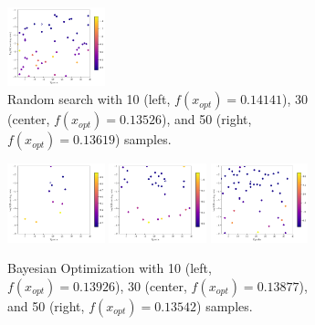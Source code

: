 \begin{figure}[H]
\begin{subfigure}{\textwidth}
		\includegraphics[width=0.31\textwidth]{figures/Results/First_comparison/Random50}
		\caption{ Random search with 10 (left, $f(x_{opt}) = 0.14141$), 30 (center, $f(x_{opt}) = 0.13526$), and 50 (right, $f(x_{opt}) = 0.13619$) samples. }
		\label{fig:first_comparison_random_search}
	\end{subfigure}
	\begin{subfigure}{\textwidth}
		\centering
		\includegraphics[width=0.31\textwidth]{figures/Results/First_comparison/Bayesian10}
		\includegraphics[width=0.31\textwidth]{figures/Results/First_comparison/Bayesian30}
		\includegraphics[width=0.31\textwidth]{figures/Results/First_comparison/Bayesian50}
		\caption{ Bayesian Optimization with 10 (left, $f(x_{opt}) = 0.13926$), 30 (center, $f(x_{opt}) = 0.13877$), and 50 (right, $f(x_{opt}) = 0.13542$) samples. }
		\label{fig:first_comparison_bayesian_optimization}
	\end{subfigure}
	\begin{subfigure}{\textwidth}

\end{subfigure}
\end{figure}
